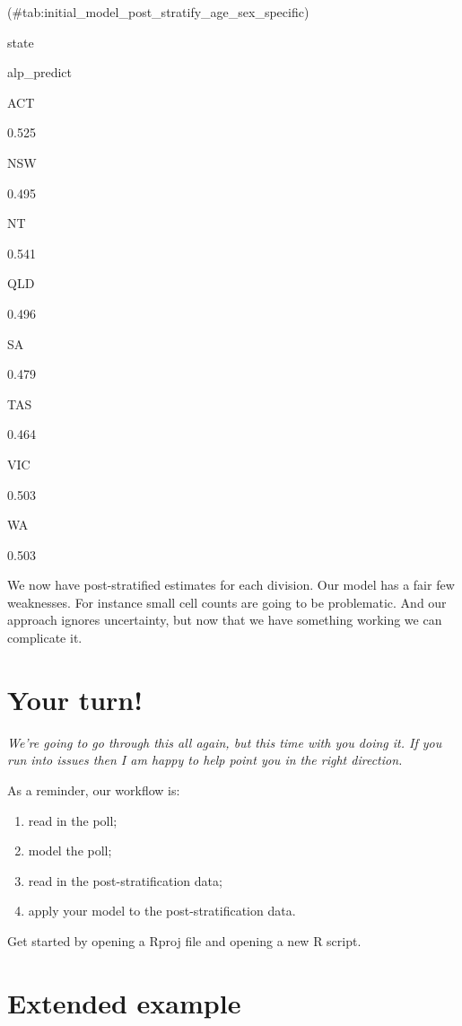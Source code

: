 \documentclass[
]{book}
\providecommand{\tightlist}{%
  \setlength{\itemsep}{0pt}\setlength{\parskip}{0pt}}
\begin{document}
(\#tab:initial\_model\_post\_stratify\_age\_sex\_specific)

state

alp\_predict

ACT

0.525

NSW

0.495

NT

0.541

QLD

0.496

SA

0.479

TAS

0.464

VIC

0.503

WA

0.503

We now have post-stratified estimates for each division. Our model has a fair few weaknesses. For instance small cell counts are going to be problematic. And our approach ignores uncertainty, but now that we have something working we can complicate it.

\hypertarget{your-turn}{%
\section{Your turn!}\label{your-turn}}

\emph{We're going to go through this all again, but this time with you doing it. If you run into issues then I am happy to help point you in the right direction.}

As a reminder, our workflow is:

\begin{enumerate}
\def\labelenumi{\arabic{enumi})}
\tightlist
\item
  read in the poll;
\item
  model the poll;
\item
  read in the post-stratification data;
\item
  apply your model to the post-stratification data.
\end{enumerate}

Get started by opening a Rproj file and opening a new R script.

\hypertarget{extended-example}{%
\section{Extended example}\label{extended-example}}
\end{document}
